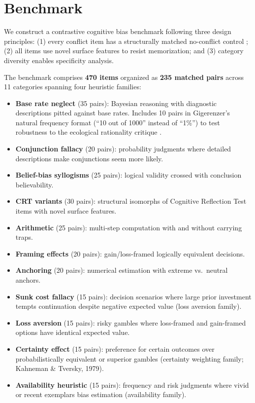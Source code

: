 \documentclass[accepted]{article}
\begin{document}

\section{Benchmark}
\label{sec:benchmark}

We construct a contrastive cognitive bias benchmark following three
design principles: (1) every conflict item has a structurally matched
no-conflict control \citep{deneys2012bias}; (2) all items use novel
surface features to resist memorization; and (3) category diversity
enables specificity analysis.

The benchmark comprises \textbf{470 items} organized as \textbf{235
matched pairs} across 11 categories spanning four heuristic families:

\begin{itemize}[leftmargin=*,itemsep=1pt]
  \item \textbf{Base rate neglect} (35 pairs): Bayesian reasoning with
  diagnostic descriptions pitted against base rates.  Includes 10 pairs
  in Gigerenzer's natural frequency format (``10 out of 1000'' instead
  of ``1\%'') to test robustness to the ecological rationality critique
  \citep{gigerenzer1995improve}.
  \item \textbf{Conjunction fallacy} (20 pairs): probability judgments
  where detailed descriptions make conjunctions seem more likely.
  \item \textbf{Belief-bias syllogisms} (25 pairs): logical validity
  crossed with conclusion believability.
  \item \textbf{CRT variants} (30 pairs): structural isomorphs of
  Cognitive Reflection Test items with novel surface features.
  \item \textbf{Arithmetic} (25 pairs): multi-step computation with
  and without carrying traps.
  \item \textbf{Framing effects} (20 pairs): gain/loss-framed logically
  equivalent decisions.
  \item \textbf{Anchoring} (20 pairs): numerical estimation with
  extreme vs.\ neutral anchors.
  \item \textbf{Sunk cost fallacy} (15 pairs): decision scenarios where
  large prior investment tempts continuation despite negative expected
  value (loss aversion family).
  \item \textbf{Loss aversion} (15 pairs): risky gambles where
  loss-framed and gain-framed options have identical expected value.
  \item \textbf{Certainty effect} (15 pairs): preference for certain
  outcomes over probabilistically equivalent or superior gambles
  (certainty weighting family; Kahneman \& Tversky, 1979).
  \item \textbf{Availability heuristic} (15 pairs): frequency and risk
  judgments where vivid or recent exemplars bias estimation
  (availability family).
\end{itemize}
\end{document}
